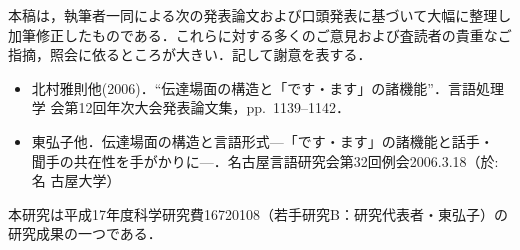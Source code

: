 \documentclass[japanese]{jnlp_1.3c}
\begin{document}
本稿は，執筆者一同による次の発表論文および口頭発表に基づいて大幅に整理し
加筆修正したものである．これらに対する多くのご意見および査読者の貴重なご
指摘，照会に依るところが大きい．記して謝意を表する．

\begin{itemize}
\item 北村雅則他(2006)．``伝達場面の構造と「です・ます」の諸機能''．言語処理学
      会第12回年次大会発表論文集，pp.~1139--1142．
\item 東弘子他．伝達場面の構造と言語形式—「です・ます」の諸機能と話手・
      聞手の共在性を手がかりに—．名古屋言語研究会第32回例会2006.3.18（於:名
      古屋大学）
\end{itemize}


本研究は平成17年度科学研究費16720108（若手研究B：研究代表者・東弘子）の
研究成果の一つである．
\end{document}
